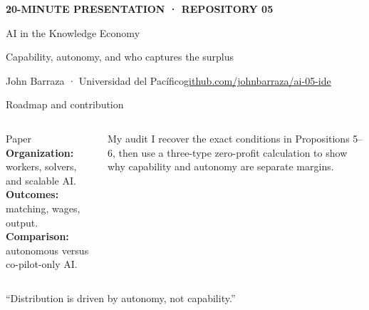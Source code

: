 \documentclass[aspectratio=169,10pt]{beamer}
\begin{document}
\begin{frame}[plain]
\vspace{.42cm}
{\color{IDERed}\large\bfseries 20-MINUTE PRESENTATION · REPOSITORY 05}\par\vspace{.28cm}
{\color{IDENavy}AI in the Knowledge Economy}\par\vspace{.2cm}
{\large Capability, autonomy, and who captures the surplus}\par\vspace{.48cm}
\vfill
John Barraza · Universidad del Pacífico\hfill\href{\repoURL}{github.com/johnbarraza/ai-05-ide}
\end{frame}

\begin{frame}{Roadmap and contribution}
\small
\begin{columns}[T,onlytextwidth]
\begin{block}{Paper}
\textbf{Organization:} workers, solvers, and scalable AI.\\[.15cm]
\textbf{Outcomes:} matching, wages, output.\\[.15cm]
\textbf{Comparison:} autonomous versus co-pilot-only AI.
\end{block}
\begin{alertblock}{My audit}
I recover the exact conditions in Propositions 5–6, then use a three-type zero-profit calculation to show why capability and autonomy are separate margins.
\end{alertblock}
\end{columns}
\vspace{.22cm}
\centering
{}\quad “Distribution is driven by autonomy, not capability.”
\end{frame}
\end{document}
